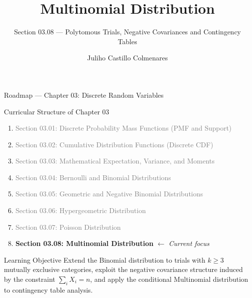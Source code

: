 \documentclass[aspectratio=169,xcolor={dvipsnames,table}]{beamer}
\title{Multinomial Distribution}
\subtitle{Section 03.08 --- Polytomous Trials, Negative Covariances and Contingency Tables}
\author[J. Castillo Colmenares]{Juliho Castillo Colmenares}
\institute[Tec de Monterrey]{Tecnologico de Monterrey}
\date{\vspace{-1.5cm}}
\begin{document}
\begin{frame}[plain]
	\titlepage
\end{frame}

\begin{frame}{Roadmap --- Chapter 03: Discrete Random Variables}
	\vspace{-0.15cm}
	\begin{block}{Curricular Structure of Chapter 03}
		\footnotesize
		\begin{enumerate}\itemsep=0.03cm
			\item \textcolor{gray}{Section 03.01: Discrete Probability Mass Functions (PMF and Support)}
			\item \textcolor{gray}{Section 03.02: Cumulative Distribution Functions (Discrete CDF)}
			\item \textcolor{gray}{Section 03.03: Mathematical Expectation, Variance, and Moments}
			\item \textcolor{gray}{Section 03.04: Bernoulli and Binomial Distributions}
			\item \textcolor{gray}{Section 03.05: Geometric and Negative Binomial Distributions}
			\item \textcolor{gray}{Section 03.06: Hypergeometric Distribution}
			\item \textcolor{gray}{Section 03.07: Poisson Distribution}
			\item \textbf{\textcolor{TecRojo}{Section 03.08: Multinomial Distribution}} $\leftarrow$ \emph{Current focus}
		\end{enumerate}
	\end{block}
	\vspace{-0.2cm}
	\begin{alertblock}{Learning Objective}
		\scriptsize
		Extend the Binomial distribution to trials with $k \ge 3$ mutually exclusive categories, exploit the negative covariance structure induced by the constraint $\sum_{i} X_{i} = n$, and apply the conditional Multinomial distribution to contingency table analysis.
	\end{alertblock}
\end{frame}
\end{document}

